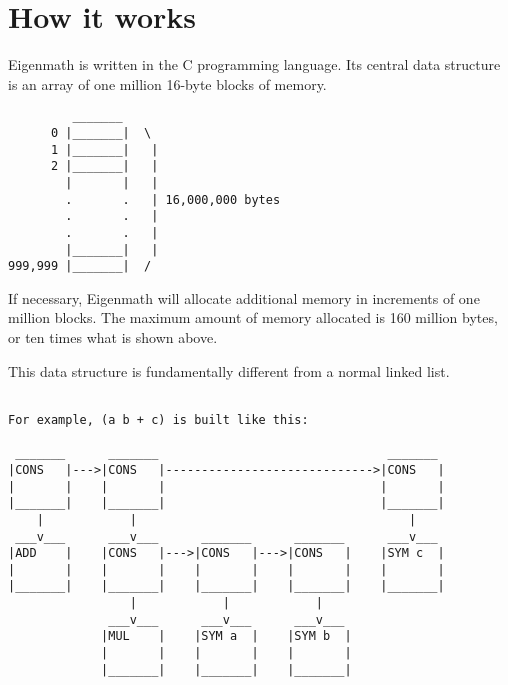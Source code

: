\chapter{How it works}

Eigenmath is written in the C programming language.
Its central data structure is
an array of one million 16-byte blocks of memory.
\begin{verbatim}
         _______ 
      0 |_______|  \
      1 |_______|   |
      2 |_______|   |
        |       |   |
        .       .   | 16,000,000 bytes
        .       .   |
        .       .   |
        |_______|   |
999,999 |_______|  /
\end{verbatim}
If necessary, Eigenmath will allocate additional memory in increments of one
million blocks.
The maximum amount of memory allocated is 160 million bytes,
or ten times what is shown above.

\newpage

This data structure is fundamentally different from a normal linked
list.

\begin{verbatim}

For example, (a b + c) is built like this:

 _______      _______                                _______
|CONS   |--->|CONS   |----------------------------->|CONS   |
|       |    |       |                              |       |
|_______|    |_______|                              |_______|
    |            |                                      |
 ___v___      ___v___      _______      _______      ___v___
|ADD    |    |CONS   |--->|CONS   |--->|CONS   |    |SYM c  |
|       |    |       |    |       |    |       |    |       |
|_______|    |_______|    |_______|    |_______|    |_______|
                 |            |            |
              ___v___      ___v___      ___v___
             |MUL    |    |SYM a  |    |SYM b  |
             |       |    |       |    |       |
             |_______|    |_______|    |_______|
\end{verbatim}
